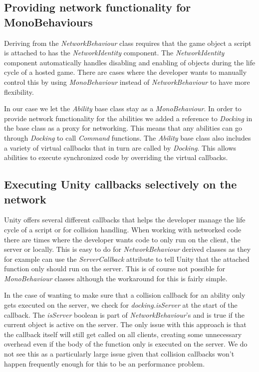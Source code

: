 \subsection{Providing network functionality for MonoBehaviours}
Deriving from the \emph{NetworkBehaviour} class requires that the game object a script is attached to has the \emph{NetworkIdentity} component. The \emph{NetworkIdentity} component automatically handles disabling and enabling of objects during the life cycle of a hosted game. There are cases where the developer wants to manually control this by using \emph{MonoBehaviour} instead of \emph{NetworkBehaviour} to have more flexibility. 

In our case we let the \emph{Ability} base class stay as a \emph{MonoBehaviour}. In order to provide network functionality for the abilities we added a reference to \emph{Docking} in the base class as a proxy for networking. This means that any abilities can go through \emph{Docking} to call \emph{Command} functions. The \emph{Ability} base class also includes a variety of virtual callbacks that in turn are called by \emph{Docking}.  This allows abilities to execute synchronized code by overriding the virtual callbacks. 

\subsection{Executing Unity callbacks selectively on the network}
Unity offers several different callbacks that helps the developer manage the life cycle of a script or for collision handling. When working with networked code there are times where the developer wants code to only run on the client, the server or locally. This is easy to do for \emph{NetworkBehaviour} derived classes as they for example can use the \emph{ServerCallback} attribute to tell Unity that the attached function only should run on the server. This is of course not possible for \emph{MonoBehaviour} classes although the workaround for this is fairly simple. 

In the case of wanting to make sure that a collision callback for an ability only gets executed on the server, we check for \emph{docking.isServer} at the start of the callback. The \emph{isServer} boolean is part of \emph{NetworkBehaviour}'s and is true if the current object is active on the server. The only issue with this approach is that the callback itself will still get called on all clients, creating some unnecessary overhead even if the body of the function only is executed on the server. We do not see this as a particularly large issue given that collision callbacks won't happen frequently enough for this to be an performance problem.

